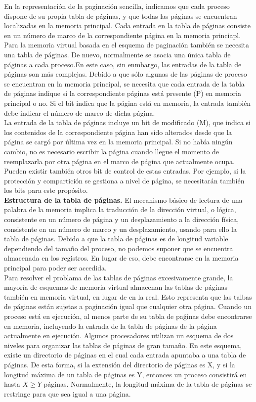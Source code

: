 \documentclass{article}
\begin{document}
		En la representación de la paginación sencilla, indicamos que cada proceso dispone de su propia tabla de páginas, y que todas las páginas se encuentran localizadas en la memoria principal. Cada entrada en la tabla de páginas consiste en un número de marco de la correspondiente página en la memoria princiapl. Para la memoria virtual basada en el esquema de paginación también se necesita una tabla de páginas. De nuevo, normalmente se asocia una única tabla de páginas a cada proceso.En este caso, sin enmbargo, las entradas de la tabla de páginas son más complejas. Debido a que sólo algunas de las páginas de proceso se encuentran en la memoria principal, se necesita que cada entrada de la tabla de páginas indique si la correspondiente páginas está presente (P) en memoria principal o no. Si el bit indica que la página está en memoria, la entrada también debe indicar el número de marco de dicha página. \\
		
		La entrada de la tabla de páginas incluye un bit de modificado (M), que indica si los contenidos de la correspondiente página han sido alterados desde que la página se cargó por última vez en la memoria principal. Si no había ningún cambio, no es necesario escribir la página cuando llegue el momento de reemplazarla por otra página en el marco de página que actualmente ocupa. Pueden existir también otros bit de control de estas entradas. Por ejemplo, si la protección y compartición se gestiona a nivel de página, se necesitarán también los bits para este propósito. \\
		
		\textbf{Estructura de la tabla de páginas.} El mecanismo básico de lectura de una palabra de la memoria implica la traducción de la dirección virtual, o lógica, consistente en un número de página y un desplazamiento a la dirección física, consistente en un número de marco y un desplazamiento, usando para ello la tabla de páginas. Debido a que la tabla de páginas es de longitud variable dependiendo del tamaño del proceso, no podemos suponer que se encuentra almacenada en los registros. En lugar de eso, debe encontrarse en la memoria principal para poder ser accedida. \\
		
 		Para resolver el problama de las tablas de páginas excesivamente grande, la mayoría de esquemas de memoria virtual almacenan las tablas de páginas también en memoria virtual, en lugar de en la real. Esto representa que las talbas de páginas están sujetas a paginación igual que cualquier otra página. Cuando un proceso está en ejecución, al menos parte de su tabla de paǵinas debe encontrarse en memoria, incluyendo la entrada de la tabla de páginas de la página actualmente en ejecución. Algunos procesadores utilizan un esquema de dos niveles para organizar las tablas de páginas de gran tamaño. En este esquema, existe un directorio de páginas en el cual cada entrada apuntaba a una tabla de páginas. De esta forma, si la extensión del directorio de páginas es X, y si la longitud máxima de un tabla de páginas es Y, entonces un proceso consistirá en hasta $X \geq Y$ páginas. Normalmente, la longitud máxima de la tabla de páginas se restringe para que sea igual a una página. \\
 		
\end{document}
